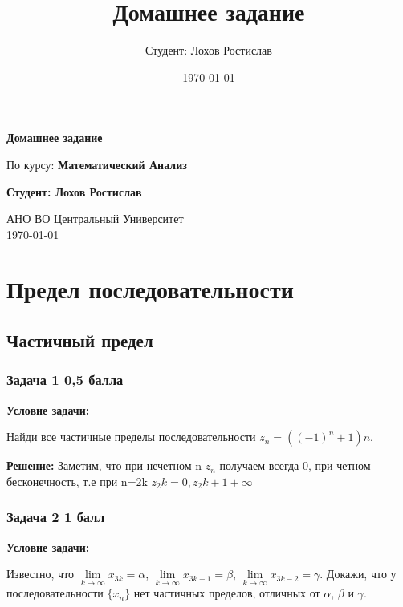 \documentclass[a4paper,12pt]{article}
\title{Домашнее задание}
\author{Студент: Лохов Ростислав}
\date{\today}
\begin{document}
\begin{titlepage}
    \centering
    \vspace*{1cm}

    \Huge
    \textbf{Домашнее задание}

    \vspace{0.5cm}
    \LARGE
    По курсу: \textbf{Математический Анализ}

    \vspace{1.5cm}

    \textbf{Студент: Лохов Ростислав}

    \vfill

    \Large
    АНО ВО Центральный Университет\\
    \vspace{0.3cm}
    \today

\end{titlepage}

\tableofcontents
\newpage

\section{Предел последовательности}

\subsection{Частичный предел}

\subsubsection{Задача 1 \hfill 0,5 балла}

\textbf{Условие задачи:}

Найди все частичные пределы последовательности \( z_n = \left( (-1)^n + 1 \right) n \).

\textbf{Решение: }
Заметим, что при нечетном n $z_n$ получаем всегда 0, при четном - бесконечность, т.е при n=2k 
$z_2k = 0, z_2k+1 + \infty $

\vspace{1cm}

\subsubsection{Задача 2 \hfill 1 балл}

\textbf{Условие задачи:}

Известно, что \( \lim\limits_{k \to \infty} x_{3k} = \alpha \), \( \lim\limits_{k \to \infty} x_{3k-1} = \beta \), \( \lim\limits_{k \to \infty} x_{3k-2} = \gamma \). Докажи, что у последовательности \( \{ x_n \} \) нет частичных пределов, отличных от \( \alpha \), \( \beta \) и \( \gamma \).
\end{document}

